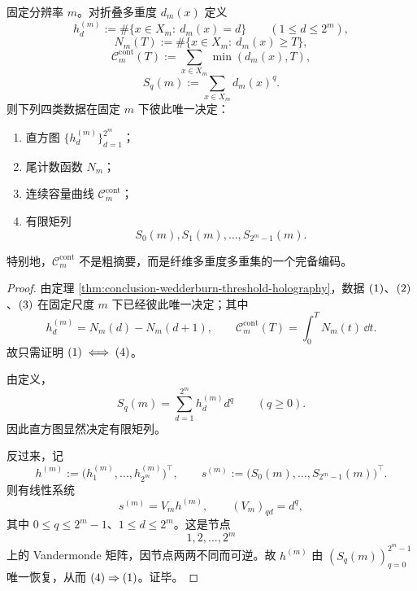 \begin{theorem}[固定尺度容量曲线的有限完备性]\label{thm:conclusion-capacity-finite-completeness}
固定分辨率 \(m\)。对折叠多重度 \(d_m(x)\) 定义
\[
h_d^{(m)}:=\#\{x\in X_m:\ d_m(x)=d\}
\qquad (1\le d\le 2^m),
\]
\[
N_m(T):=\#\{x\in X_m:\ d_m(x)\ge T\},
\]
\[
\mathcal C_m^{\mathrm{cont}}(T):=\sum_{x\in X_m}\min(d_m(x),T),
\]
\[
S_q(m):=\sum_{x\in X_m}d_m(x)^q.
\]
则下列四类数据在固定 \(m\) 下彼此唯一决定：
\begin{enumerate}
  \item 直方图 \(\{h_d^{(m)}\}_{d=1}^{2^m}\)；
  \item 尾计数函数 \(N_m\)；
  \item 连续容量曲线 \(\mathcal C_m^{\mathrm{cont}}\)；
  \item 有限矩列
  \[
  S_0(m),S_1(m),\dots,S_{2^m-1}(m).
  \]
\end{enumerate}
特别地，\(\mathcal C_m^{\mathrm{cont}}\) 不是粗摘要，而是纤维多重度多重集的一个完备编码。
\end{theorem}
\begin{proof}
由定理 \ref{thm:conclusion-wedderburn-threshold-holography}，数据 \(\textup{(1)}\)、\(\textup{(2)}\)、\(\textup{(3)}\) 在固定尺度 \(m\) 下已经彼此唯一决定；其中
\[
h_d^{(m)}=N_m(d)-N_m(d+1),
\qquad
\mathcal C_m^{\mathrm{cont}}(T)=\int_0^T N_m(t)\,\dd t.
\]
故只需证明 \(\textup{(1)}\iff\textup{(4)}\)。

由定义，
\[
S_q(m)=\sum_{d=1}^{2^m}h_d^{(m)}d^q
\qquad (q\ge 0).
\]
因此直方图显然决定有限矩列。

反过来，记
\[
h^{(m)}:=\bigl(h_1^{(m)},\dots,h_{2^m}^{(m)}\bigr)^\top,
\qquad
s^{(m)}:=\bigl(S_0(m),\dots,S_{2^m-1}(m)\bigr)^\top.
\]
则有线性系统
\[
s^{(m)}=V_m h^{(m)},
\qquad
(V_m)_{qd}=d^q,
\]
其中 \(0\le q\le 2^m-1\)、\(1\le d\le 2^m\)。这是节点
\[
1,2,\dots,2^m
\]
上的 Vandermonde 矩阵，因节点两两不同而可逆。故 \(h^{(m)}\) 由 \((S_q(m))_{q=0}^{2^m-1}\) 唯一恢复，从而 \(\textup{(4)}\Rightarrow\textup{(1)}\)。证毕。
\end{proof}

